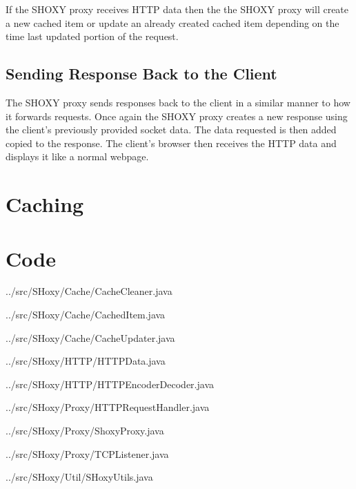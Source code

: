 \documentclass[11pt]{article}
\begin{document}
If the SHOXY proxy receives HTTP data then the the SHOXY proxy will create a new cached item or update an already created cached item depending on the time last updated portion of the request. 

\subsection{Sending Response Back to the Client}
The SHOXY proxy sends responses back to the client in a similar manner to how it forwards requests. Once again the SHOXY proxy creates a new response using the client's previously provided socket data. The data requested is then added copied to the response. The client's browser then receives the HTTP data and displays it like a normal webpage.  


\section{Caching}
\section{Code}

\begin{tiny}

\begin{lstinputlisting}[language=Java]{../src/SHoxy/Cache/CacheCleaner.java}
\end{lstinputlisting}
\begin{lstinputlisting}[language=Java]{../src/SHoxy/Cache/CachedItem.java}
\end{lstinputlisting}
\begin{lstinputlisting}[language=Java]{../src/SHoxy/Cache/CacheUpdater.java}
\end{lstinputlisting}
\begin{lstinputlisting}[language=Java]{../src/SHoxy/HTTP/HTTPData.java}
\end{lstinputlisting}
\begin{lstinputlisting}[language=Java]{../src/SHoxy/HTTP/HTTPEncoderDecoder.java}
\end{lstinputlisting}
\begin{lstinputlisting}[language=Java]{../src/SHoxy/Proxy/HTTPRequestHandler.java}
\end{lstinputlisting}
\begin{lstinputlisting}[language=Java]{../src/SHoxy/Proxy/ShoxyProxy.java}
\end{lstinputlisting}
\begin{lstinputlisting}[language=Java]{../src/SHoxy/Proxy/TCPListener.java}
\end{lstinputlisting}
\begin{lstinputlisting}[language=Java]{../src/SHoxy/Util/SHoxyUtils.java}
\end{lstinputlisting}

\end{tiny}
\end{document}
